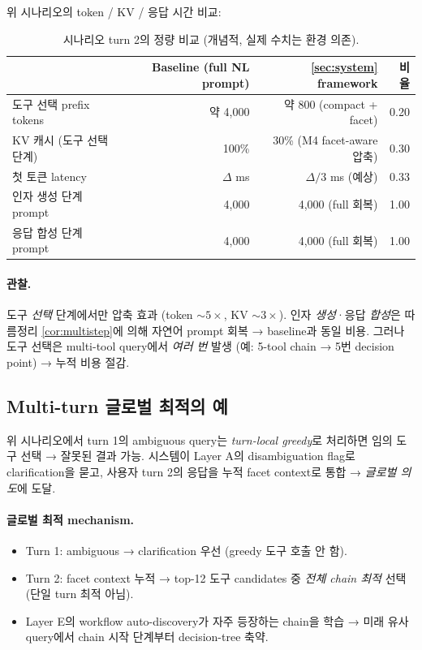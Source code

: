 위 시나리오의 token / KV / 응답 시간 비교:

\begin{table}[h]
\centering
\caption{시나리오 turn 2의 정량 비교 (개념적, 실제 수치는 환경 의존).}
\label{tab:scenario-cost}
\small
\begin{tabular}{lrrr}
\toprule
& Baseline (full NL prompt) & \cref{sec:system} framework & 비율 \\
\midrule
도구 선택 prefix tokens & 약 4,000 & 약 800 (compact + facet) & 0.20 \\
KV 캐시 (도구 선택 단계) & 100\% & 30\% (M4 facet-aware 압축) & 0.30 \\
첫 토큰 latency & $\Delta$ ms & $\Delta/3$ ms (예상) & 0.33 \\
인자 생성 단계 prompt & 4,000 & 4,000 (full 회복) & 1.00 \\
응답 합성 단계 prompt & 4,000 & 4,000 (full 회복) & 1.00 \\
\bottomrule
\end{tabular}
\end{table}

\paragraph{관찰.}
도구 \emph{선택} 단계에서만 압축 효과 (token $\sim 5\times$, KV $\sim 3\times$). 인자 \emph{생성}·응답 \emph{합성}은 따름정리 \ref{cor:multistep}에 의해 자연어 prompt 회복 → baseline과 동일 비용. 그러나 도구 선택은 multi-tool query에서 \emph{여러 번} 발생 (예: 5-tool chain → 5번 decision point) → 누적 비용 절감.

\subsection{Multi-turn 글로벌 최적의 예}

위 시나리오에서 turn 1의 ambiguous query는 \emph{turn-local greedy}로 처리하면 임의 도구 선택 → 잘못된 결과 가능. 시스템이 Layer A의 disambiguation flag로 clarification을 묻고, 사용자 turn 2의 응답을 누적 facet context로 통합 → \emph{글로벌 의도}에 도달.

\paragraph{글로벌 최적 mechanism.}
\begin{itemize}[leftmargin=*]
\item Turn 1: ambiguous → clarification 우선 (greedy 도구 호출 안 함).
\item Turn 2: facet context 누적 → top-12 도구 candidates 중 \emph{전체 chain 최적} 선택 (단일 turn 최적 아님).
\item Layer E의 workflow auto-discovery가 자주 등장하는 chain을 학습 → 미래 유사 query에서 chain 시작 단계부터 decision-tree 축약.
\end{itemize}

